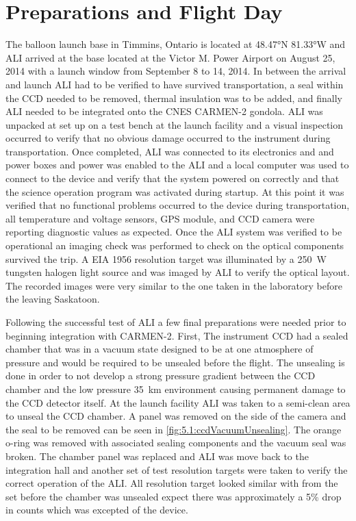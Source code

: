 \section{Preparations and Flight Day}

The balloon launch base in Timmins, Ontario is located at 48.47\si{\degree}N 81.33\si{\degree}W and ALI arrived at the base located at the Victor M. Power Airport on August 25, 2014 with a launch window from September 8 to 14, 2014. In between the arrival and launch ALI had to be verified to have survived transportation, a seal within the CCD needed to be removed, thermal insulation was to be added, and finally ALI needed to be integrated onto the CNES CARMEN-2 gondola. ALI was unpacked at set up on a test bench at the launch facility and a visual inspection occurred to verify that no obvious damage occurred to the instrument during transportation. Once completed, ALI was connected to its electronics and and power boxes and power was enabled to the ALI and a local computer was used to connect to the device and verify that the system powered on correctly and that the science operation program was activated during startup. At this point it was verified that no functional problems occurred to the device during transportation, all temperature and voltage sensors, GPS module, and CCD camera were reporting diagnostic values as expected. Once the ALI system was verified to be operational an imaging check was performed to check on the optical components survived the trip. A EIA 1956 resolution target was illuminated by a 250~W tungsten halogen light source and was imaged by ALI to verify the optical layout. The recorded images were very similar to the one taken in the laboratory before the leaving Saskatoon. 

Following the successful test of ALI a few final preparations were needed prior to beginning integration with CARMEN-2. First, The instrument CCD had a sealed chamber that was in a vacuum state designed to be at one atmosphere of pressure and would be required to be unsealed before the flight. The unsealing is done in order to not develop a strong pressure gradient between the CCD chamber and the low pressure 35~km environment causing permanent damage to the CCD detector itself. At the launch facility ALI was taken to a semi-clean area to unseal the CCD chamber. A panel was removed on the side of the camera and the seal to be removed can be seen in \autoref{fig:5.1:ccdVacuumUnsealing}. The orange o-ring was removed with associated sealing components and the vacuum seal was broken. The chamber panel was replaced and ALI was move back to the integration hall and another set of test resolution targets were taken to verify the correct operation of the ALI. All resolution target looked similar with from the set before the chamber was unsealed expect there was approximately a 5\% drop in counts which was excepted of the device.  

